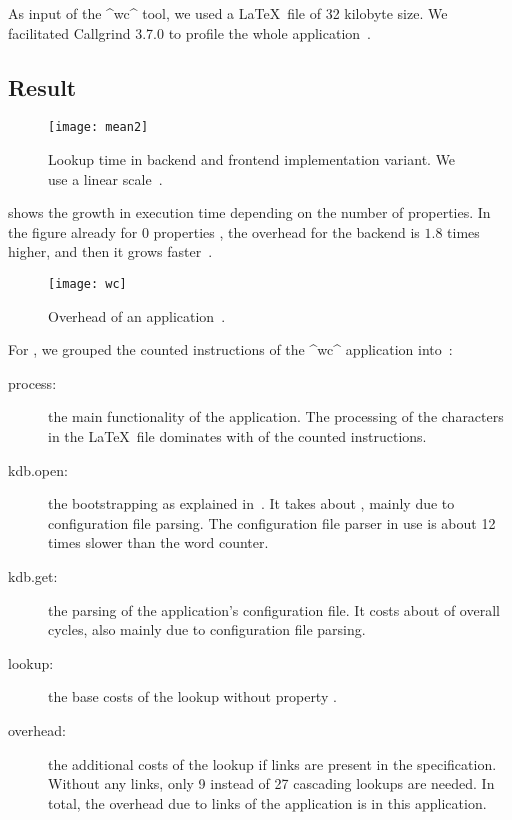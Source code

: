 
As input of the ^wc^ tool, we used a \LaTeX~file of 32 kilobyte size.
We facilitated Callgrind 3.7.0 to profile the whole application~\cite{raab2015kps}.



\subsection{Result}

\begin{figure}[htp]
\centering
\texttt{[image: mean2]}
\caption[Lookup time in backend and frontend implementation variant.]{Lookup time in backend and frontend implementation variant.
We use a linear scale~\cite{raab2015kps}.}
\label{fig:combined}
\end{figure}

 shows the growth in execution time depending on the number of  properties.
In the figure already for 0 properties , the overhead for the backend is $1.8$ times higher, and then it grows  faster~\cite{raab2015kps}.

\begin{figure}[htp]
\centering
\texttt{[image: wc]}
\caption{Overhead of an  application~\cite{raab2015kps}.}
\label{fig:wc}
\end{figure}

For , we grouped the counted instructions of the ^wc^ application into~\cite{raab2015kps}:
\begin{description}
\item[process:] the main functionality of the application.
The processing of the characters in the \LaTeX~file dominates with  of the counted instructions.
\item[kdb.open:] the bootstrapping as explained in~.
It takes about , mainly due to configuration file parsing.
The configuration file parser in use is about 12 times slower than the word counter.
\item[kdb.get:] the parsing of the application's configuration file.
It costs about  of overall cycles, also mainly due to configuration file parsing.
\item[lookup:] the base costs of the lookup without property .
\item[overhead:] the additional costs of the lookup if links are present in the specification.
Without any links, only 9 instead of 27 cascading lookups are needed.
In total, the overhead due to links of the application is  in this application.
\end{description}



